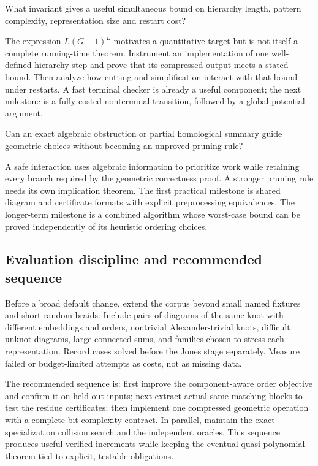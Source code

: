 \begin{question}
What invariant gives a useful simultaneous bound on hierarchy length,
pattern complexity, representation size and restart cost?
\end{question}

The expression $L(G+1)^L$ motivates a quantitative target but is not itself
a complete running-time theorem. Instrument an implementation of one
well-defined hierarchy step and prove that its compressed output meets a
stated bound. Then analyze how cutting and simplification interact with
that bound under restarts. A fast terminal checker is already a useful
component; the next milestone is a fully costed nonterminal transition,
followed by a global potential argument.

\begin{question}
Can an exact algebraic obstruction or partial homological summary guide
geometric choices without becoming an unproved pruning rule?
\end{question}

A safe interaction uses algebraic information to prioritize work while
retaining every branch required by the geometric correctness proof.
A stronger pruning rule needs its own implication theorem.
The first practical milestone is shared diagram and certificate formats
with explicit preprocessing equivalences. The longer-term milestone is
a combined algorithm whose worst-case bound can be proved independently
of its heuristic ordering choices.

\subsection{Evaluation discipline and recommended sequence}

Before a broad default change, extend the corpus beyond small named
fixtures and short random braids. Include pairs of diagrams of the same
knot with different embeddings and orders, nontrivial Alexander-trivial
knots, difficult unknot diagrams, large connected sums, and families chosen
to stress each representation. Record cases solved before the Jones stage
separately. Measure failed or budget-limited attempts as costs, not as
missing data.

The recommended sequence is: first improve the component-aware order
objective and confirm it on held-out inputs; next extract actual
same-matching blocks to test the residue certificates; then implement one
compressed geometric operation with a complete bit-complexity contract.
In parallel, maintain the exact-specialization collision search and the
independent oracles. This sequence produces useful verified increments
while keeping the eventual quasi-polynomial theorem tied to explicit,
testable obligations.
